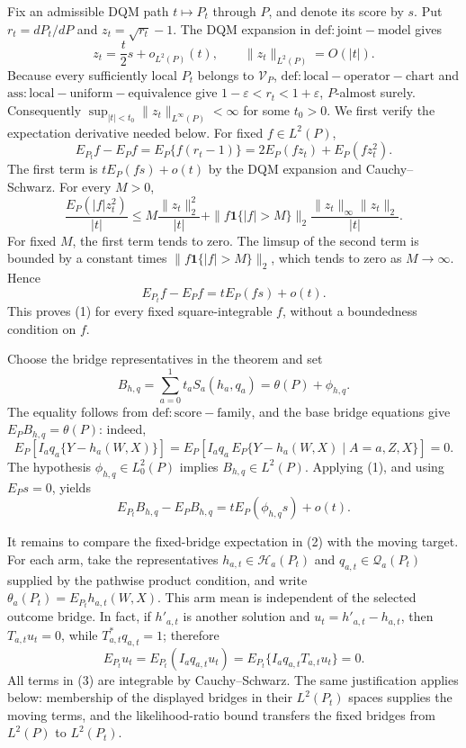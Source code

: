 Fix an admissible DQM path \(t\mapsto P_t\) through \(P\), and denote its score by \(s\).  Put \(r_t=dP_t/dP\) and \(z_t=\sqrt{r_t}-1\).  The DQM expansion in \(\mathrm{def:joint-model}\) gives
\[
 z_t=\frac{t}{2}s+o_{L^2(P)}(t),
 \qquad \|z_t\|_{L^2(P)}=O(|t|).
\]
Because every sufficiently local \(P_t\) belongs to \(\mathcal V_P\), \(\mathrm{def:local-operator-chart}\) and \(\mathrm{ass:local-uniform-equivalence}\) give \(1-\varepsilon<r_t<1+\varepsilon\), \(P\)-almost surely.  Consequently \(\sup_{|t|<t_0}\|z_t\|_{L^\infty(P)}<\infty\) for some \(t_0>0\).  We first verify the expectation derivative needed below.  For fixed \(f\in L^2(P)\),
\[
 E_{P_t}f-E_Pf
 =E_P\{f(r_t-1)\}
 =2E_P(fz_t)+E_P(fz_t^2).
\]
The first term is \(tE_P(fs)+o(t)\) by the DQM expansion and Cauchy--Schwarz.  For every \(M>0\),
\[
 \frac{E_P(|f|z_t^2)}{|t|}
 \le
 M\frac{\|z_t\|_2^2}{|t|}
 +\|f\mathbf 1\{|f|>M\}\|_2
   \frac{\|z_t\|_\infty\|z_t\|_2}{|t|}.
\]
For fixed \(M\), the first term tends to zero.  The limsup of the second term is bounded by a constant times \(\|f\mathbf 1\{|f|>M\}\|_2\), which tends to zero as \(M\to\infty\).  Hence
\[
 E_{P_t}f-E_Pf=tE_P(fs)+o(t).                                      \tag{1}
\]
This proves (1) for every fixed square-integrable \(f\), without a boundedness condition on \(f\).

Choose the bridge representatives in the theorem and set
\[
 B_{h,q}=\sum_{a=0}^1t_aS_a(h_a,q_a)
          =\theta(P)+\phi_{h,q}.
\]
The equality follows from \(\mathrm{def:score-family}\), and the base bridge equations give \(E_P B_{h,q}=\theta(P)\): indeed,
\[
 E_P[I_aq_a\{Y-h_a(W,X)\}]
 =E_P[I_aq_a\,E_P\{Y-h_a(W,X)\mid A=a,Z,X\}]=0.
\]
The hypothesis \(\phi_{h,q}\in L_0^2(P)\) implies \(B_{h,q}\in L^2(P)\).  Applying (1), and using \(E_Ps=0\), yields
\[
 E_{P_t}B_{h,q}-E_PB_{h,q}
 =tE_P(\phi_{h,q}s)+o(t).                                           \tag{2}
\]

It remains to compare the fixed-bridge expectation in (2) with the moving target.  For each arm, take the representatives \(h_{a,t}\in\mathcal H_a(P_t)\) and \(q_{a,t}\in\mathcal Q_a(P_t)\) supplied by the pathwise product condition, and write
\(\theta_a(P_t)=E_{P_t}h_{a,t}(W,X)\).  This arm mean is independent of the selected outcome bridge.  In fact, if \(h'_{a,t}\) is another solution and \(u_t=h'_{a,t}-h_{a,t}\), then \(T_{a,t}u_t=0\), while \(T_{a,t}^*q_{a,t}=1\); therefore
\[
 E_{P_t}u_t
 =E_{P_t}(I_aq_{a,t}u_t)
 =E_{P_t}\{I_aq_{a,t}T_{a,t}u_t\}=0.                               \tag{3}
\]
All terms in (3) are integrable by Cauchy--Schwarz.  The same justification applies below: membership of the displayed bridges in their \(L^2(P_t)\) spaces supplies the moving terms, and the likelihood-ratio bound transfers the fixed bridges from \(L^2(P)\) to \(L^2(P_t)\).

